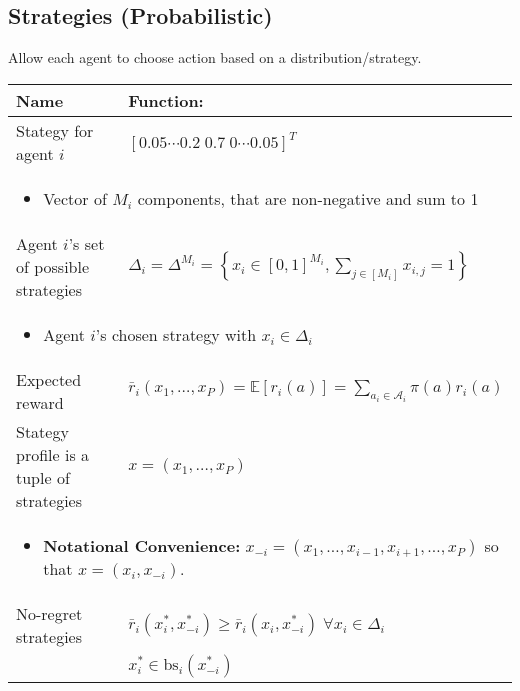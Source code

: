 \subsection{Strategies (Probabilistic)}
\begin{summary} Allow each agent to choose action based on a distribution/strategy. 
    \begin{center}
        \begin{tabular}{ll}
            \toprule
            \textbf{Name} & \textbf{Function:} \\
            \midrule
            Stategy for agent $i$ & $[0.05 \cdots 0.2 \; 0.7 \; 0 \cdots 0.05]^T$ \\
            \multicolumn{2}{p{\linewidth}}{
                \begin{itemize}
                    \item Vector of $M_i$ components, that are non-negative and sum to 1
                \end{itemize}} \\
            \midrule
            Agent $i$'s set of possible strategies & $\Delta_i = \Delta^{M_i} = \left\{x_i \in [0,1]^{M_i}, \sum_{j \in [M_i]} x_{i,j} = 1 \right\}$ \\
            \multicolumn{2}{p{\linewidth}}{
                \begin{itemize}
                    \item Agent $i$'s chosen strategy with $x_i \in \Delta_i$
                \end{itemize}} \\
            \midrule
            Expected reward & $\bar{r}_i(x_1,\ldots,x_P) = \mathbb{E}[r_i(a)] = \sum_{a_i \in \mathcal{A}_i} \pi(a) r_i(a)$ \\
            \midrule
            Stategy profile is a tuple of strategies & $x=(x_1,\ldots,x_P)$ \\
            \multicolumn{2}{p{\linewidth}}{
                \begin{itemize}
                    \item \textbf{Notational Convenience:} $x_{-i} = (x_1,\ldots,x_{i-1},x_{i+1},\ldots,x_P)$ so that $x=(x_i,x_{-i})$. 
                \end{itemize}} \\
            \midrule
            No-regret strategies & $\bar{r}_i(x_i^*,x_{-i}^*) \geq \bar{r}_i(x_i,x_{-i}^*) \; \forall x_i \in \Delta_i$ \\
            & $x_i^* \in \text{bs}_i (x_{-i}^*)$ \\

\end{tabular}
\end{center}
\end{summary}
